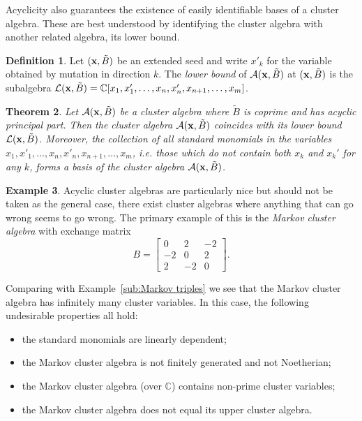 \documentclass{amsart}
\newtheorem{theorem}{Theorem}[section]
\theoremstyle{definition}
\newtheorem{definition}[theorem]{Definition}
\newtheorem{example}[theorem]{Example}
\theoremstyle{remark}
\numberwithin{equation}{section}
\newcommand{\cA}{{\mathcal{A}}}
\newcommand{\cL}{{\mathcal{L}}}
\newcommand{\x}{{\bf x}}
\newcommand{\bx}{{\bf x}}
\newcommand{\CC}{{\mathbb{C}}}
\begin{document}
  Acyclicity also guarantees the existence of easily identifiable bases of a cluster algebra.  These are best understood by identifying the cluster algebra with another related algebra, its lower bound.
  \begin{definition}
    Let $(\x,\tilde B)$ be an extended seed and write $x'_k$ for the variable obtained by mutation in direction $k$.  The \emph{lower bound} of $\cA(\x,\tilde B)$ at $(\x,\tilde B)$ is the subalgebra $\cL(\x,\tilde B)=\CC[x_1,x'_1,\ldots,x_n,x'_n,x_{n+1},\ldots,x_m]$.
  \end{definition}

  \begin{theorem}\cite{BFZ05}\label{th:lower bounds}
    Let $\cA(\x,\tilde B)$ be a cluster algebra where $\tilde B$ is coprime and has acyclic principal part.  Then the cluster algebra $\cA(\x,\tilde B)$ coincides with its lower bound $\cL(\x,\tilde B)$.  Moreover, the collection of all \emph{standard monomials} in the variables $x_1,x'_1,\ldots,x_n,x'_n,x_{n+1},\ldots,x_m$, i.e. those which do not contain both $x_k$ and $x_k'$ for any $k$, forms a basis of the cluster algebra $\cA(\bx,\tilde B)$.
  \end{theorem}

  \begin{example}
    Acyclic cluster algebras are particularly nice but should not be taken as the general case, there exist cluster algebras where anything that can go wrong seems to go wrong.  The primary example of this is the \emph{Markov cluster algebra} with exchange matrix 
    \[B=\left[\begin{array}{ccc} 0 & 2 & -2\\ -2 & 0 & 2\\ 2 & -2 & 0\end{array}\right].\]
    
    Comparing with Example~\ref{sub:Markov triples} we see that the Markov cluster algebra has infinitely many cluster variables.  In this case, the following undesirable properties all hold:
    \begin{itemize}
      \item the standard monomials are linearly dependent;
      \item the Markov cluster algebra is not finitely generated and not Noetherian;
      \item the Markov cluster algebra (over $\CC$) contains non-prime cluster variables;
      \item the Markov cluster algebra does not equal its upper cluster algebra.
    \end{itemize}
  \end{example}
\end{document}
